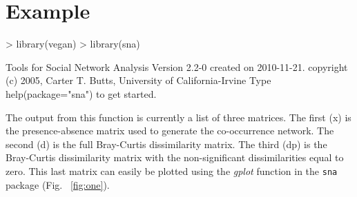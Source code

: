 \documentclass[12pt]{article}
\begin{document}
\section{Example}

\begin{Schunk}
\begin{Sinput}
> library(vegan)
> library(sna)
\end{Sinput}
\begin{Soutput}
     Tools for Social Network Analysis
Version      2.2-0 created on      2010-11-21.
copyright (c) 2005, Carter T. Butts, University of California-Irvine
Type help(package="sna") to get started.
\end{Soutput}
\end{Schunk}

The output from this function is currently a list of three
matrices. The first (x) is the presence-absence matrix used to generate
the co-occurrence network. The second (d) is the full Bray-Curtis
dissimilarity matrix. The third (dp) is the Bray-Curtis dissimilarity
matrix with the non-significant dissimilarities equal to zero. This
last matrix can easily be plotted using the \textit{gplot} function in
the \texttt{sna} package \cite{sna} (Fig. ~\ref{fig:one}).
\end{document}
